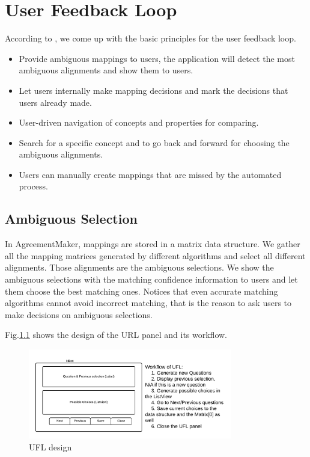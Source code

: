 \chapter{User Feedback Loop}

According to \cite{falconer2007cognitive}, we come up with the basic principles for the user feedback loop.
\begin{itemize}
	\item Provide ambiguous mappings to users, the application will detect the most ambiguous alignments and show them to users.
	\item Let users internally make mapping decisions and mark the decisions that users already made.
	\item User-driven navigation of concepts and properties for comparing.
	\item Search for a specific concept and to go back and forward for choosing the ambiguous alignments.
	\item Users can manually create mappings that are missed by the automated process.
\end{itemize}

\section{Ambiguous Selection} %
\label{sub:ambiguous_selection}
In AgreementMaker, mappings are stored in a matrix data structure. We gather all the mapping matrices generated by different algorithms and select all different alignments. Those alignments are the ambiguous selections. We show the ambiguous selections with the matching confidence information to users and let them choose the best matching ones. Notices that even accurate matching algorithms cannot avoid incorrect matching, that is the reason to ask users to make decisions on ambiguous selections.

Fig.\ref{fig:url_degisn} shows the design of the URL panel and its workflow.

\begin{figure}[htb]
	\centering
	\includegraphics[width=3.5in]{pics/VA_UFL_Design.png}
	\caption{UFL design}
	\label{fig:url_degisn}
\end{figure}

